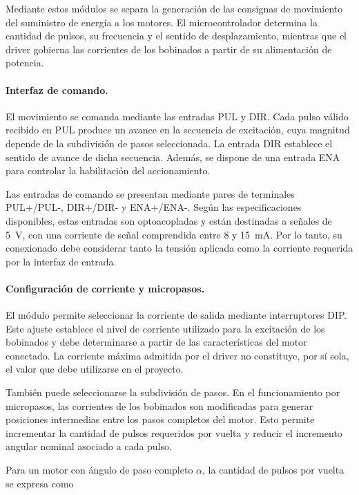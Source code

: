 \documentclass[blue,fullpaper]{ludusofficial}  %
\begin{document}
Mediante estos módulos se separa la generación
de las consignas de movimiento del suministro
de energía a los motores. El microcontrolador
determina la cantidad de pulsos, su frecuencia
y el sentido de desplazamiento, mientras que
el driver gobierna las corrientes de los
bobinados a partir de su alimentación de potencia.

\paragraph{Interfaz de comando.}

El movimiento se comanda mediante las entradas
PUL y DIR. Cada pulso válido recibido en PUL
produce un avance en la secuencia de excitación,
cuya magnitud depende de la subdivisión de pasos
seleccionada. La entrada DIR establece el sentido
de avance de dicha secuencia. Además, se dispone
de una entrada ENA para controlar la habilitación
del accionamiento.

Las entradas de comando se presentan mediante
pares de terminales PUL+/PUL-, DIR+/DIR- y
ENA+/ENA-. Según las especificaciones disponibles,
estas entradas son optoacopladas y están destinadas
a señales de 5~V, con una corriente de señal
comprendida entre 8 y 15~mA. Por lo tanto, su
conexionado debe considerar tanto la tensión
aplicada como la corriente requerida por
la interfaz de entrada.

\paragraph{Configuración de corriente y micropasos.}

El módulo permite seleccionar la corriente
de salida mediante interruptores DIP. Este ajuste
establece el nivel de corriente utilizado para
la excitación de los bobinados y debe determinarse
a partir de las características del motor conectado.
La corriente máxima admitida por el driver no
constituye, por sí sola, el valor que debe utilizarse
en el proyecto.

También puede seleccionarse la subdivisión
de pasos. En el funcionamiento por micropasos,
las corrientes de los bobinados son modificadas
para generar posiciones intermedias entre los
pasos completos del motor. Esto permite incrementar
la cantidad de pulsos requeridos por vuelta
y reducir el incremento angular nominal asociado
a cada pulso.

Para un motor con ángulo de paso completo
$\alpha$, la cantidad de pulsos por vuelta
se expresa como
\end{document}
